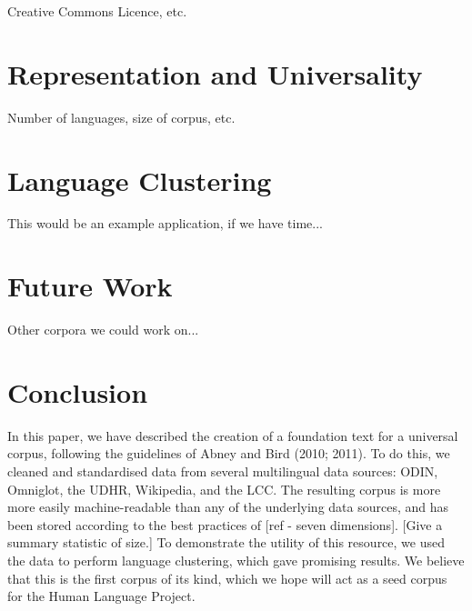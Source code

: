 \documentclass[11pt]{article}
\begin{document}
Creative Commons Licence, etc.


\section{Representation and Universality} \label{sec:stats}

Number of languages, size of corpus, etc.


\section{Language Clustering} \label{sec:cluster}

This would be an example application, if we have time...


\section{Future Work} \label{sec:future}

Other corpora we could work on...


\section{Conclusion} \label{sec:conclusion}

In this paper, we have described the creation of a foundation text for a universal corpus, following the guidelines of Abney and Bird (2010; 2011). To do this, we cleaned and standardised data from several multilingual data sources: ODIN, Omniglot, the UDHR, Wikipedia, and the LCC. The resulting corpus is more more easily machine-readable than any of the underlying data sources, and has been stored according to the best practices of [ref - seven dimensions]. [Give a summary statistic of size.] To demonstrate the utility of this resource, we used the data to perform language clustering, which gave promising results. We believe that this is the first corpus of its kind, which we hope will act as a seed corpus for the Human Language Project.



\end{document}
